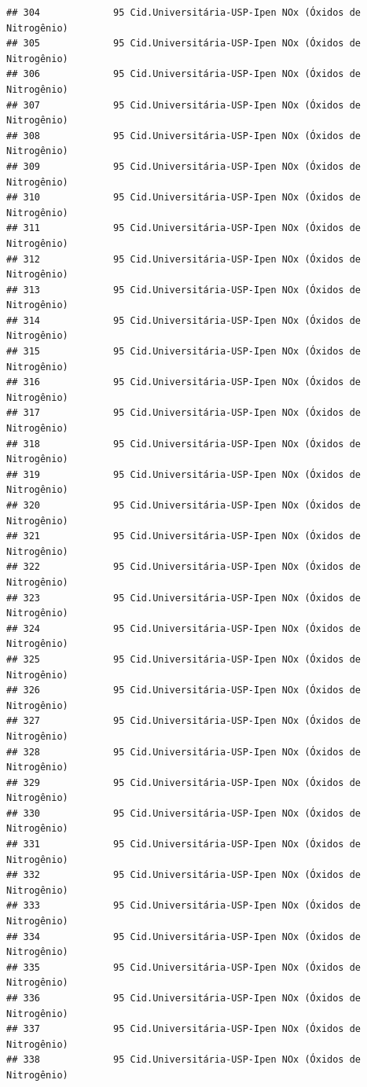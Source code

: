 \documentclass[]{book}
\begin{document}
\begin{verbatim}
## 304             95 Cid.Universitária-USP-Ipen NOx (Óxidos de Nitrogênio)
## 305             95 Cid.Universitária-USP-Ipen NOx (Óxidos de Nitrogênio)
## 306             95 Cid.Universitária-USP-Ipen NOx (Óxidos de Nitrogênio)
## 307             95 Cid.Universitária-USP-Ipen NOx (Óxidos de Nitrogênio)
## 308             95 Cid.Universitária-USP-Ipen NOx (Óxidos de Nitrogênio)
## 309             95 Cid.Universitária-USP-Ipen NOx (Óxidos de Nitrogênio)
## 310             95 Cid.Universitária-USP-Ipen NOx (Óxidos de Nitrogênio)
## 311             95 Cid.Universitária-USP-Ipen NOx (Óxidos de Nitrogênio)
## 312             95 Cid.Universitária-USP-Ipen NOx (Óxidos de Nitrogênio)
## 313             95 Cid.Universitária-USP-Ipen NOx (Óxidos de Nitrogênio)
## 314             95 Cid.Universitária-USP-Ipen NOx (Óxidos de Nitrogênio)
## 315             95 Cid.Universitária-USP-Ipen NOx (Óxidos de Nitrogênio)
## 316             95 Cid.Universitária-USP-Ipen NOx (Óxidos de Nitrogênio)
## 317             95 Cid.Universitária-USP-Ipen NOx (Óxidos de Nitrogênio)
## 318             95 Cid.Universitária-USP-Ipen NOx (Óxidos de Nitrogênio)
## 319             95 Cid.Universitária-USP-Ipen NOx (Óxidos de Nitrogênio)
## 320             95 Cid.Universitária-USP-Ipen NOx (Óxidos de Nitrogênio)
## 321             95 Cid.Universitária-USP-Ipen NOx (Óxidos de Nitrogênio)
## 322             95 Cid.Universitária-USP-Ipen NOx (Óxidos de Nitrogênio)
## 323             95 Cid.Universitária-USP-Ipen NOx (Óxidos de Nitrogênio)
## 324             95 Cid.Universitária-USP-Ipen NOx (Óxidos de Nitrogênio)
## 325             95 Cid.Universitária-USP-Ipen NOx (Óxidos de Nitrogênio)
## 326             95 Cid.Universitária-USP-Ipen NOx (Óxidos de Nitrogênio)
## 327             95 Cid.Universitária-USP-Ipen NOx (Óxidos de Nitrogênio)
## 328             95 Cid.Universitária-USP-Ipen NOx (Óxidos de Nitrogênio)
## 329             95 Cid.Universitária-USP-Ipen NOx (Óxidos de Nitrogênio)
## 330             95 Cid.Universitária-USP-Ipen NOx (Óxidos de Nitrogênio)
## 331             95 Cid.Universitária-USP-Ipen NOx (Óxidos de Nitrogênio)
## 332             95 Cid.Universitária-USP-Ipen NOx (Óxidos de Nitrogênio)
## 333             95 Cid.Universitária-USP-Ipen NOx (Óxidos de Nitrogênio)
## 334             95 Cid.Universitária-USP-Ipen NOx (Óxidos de Nitrogênio)
## 335             95 Cid.Universitária-USP-Ipen NOx (Óxidos de Nitrogênio)
## 336             95 Cid.Universitária-USP-Ipen NOx (Óxidos de Nitrogênio)
## 337             95 Cid.Universitária-USP-Ipen NOx (Óxidos de Nitrogênio)
## 338             95 Cid.Universitária-USP-Ipen NOx (Óxidos de Nitrogênio)

\end{verbatim}
\end{document}
